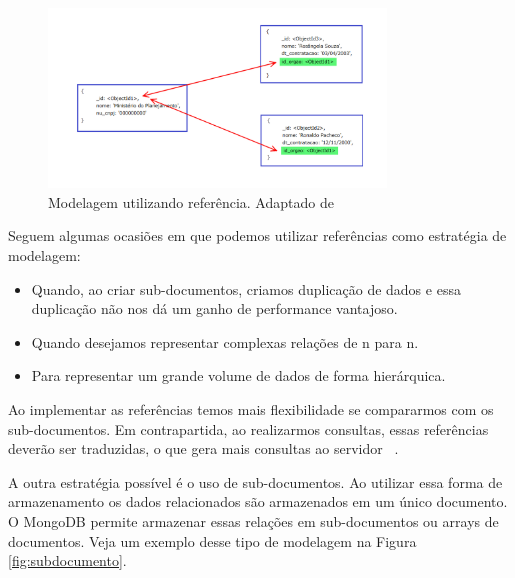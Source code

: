 	\begin{figure}[!htbp]
		\begin{center}
			\includegraphics[width=0.8\textwidth]{referencia}
		\end{center}
		\caption{ Modelagem utilizando referência. Adaptado de ~\cite{sitemongodb}}
		\label{fig:referencia}
	\end{figure}

Seguem algumas ocasiões em que podemos utilizar referências como estratégia de modelagem:

\begin{itemize}
	\item Quando, ao criar sub-documentos, criamos duplicação de dados e essa duplicação não nos dá um ganho de performance vantajoso.
	\item Quando desejamos representar complexas relações de n para n.
	\item Para representar um grande volume de dados de forma hierárquica.
\end{itemize}

Ao implementar as referências temos mais flexibilidade se compararmos com os sub-documentos. Em contrapartida, ao realizarmos consultas, essas referências deverão ser traduzidas, o que gera mais consultas ao servidor ~\cite{Orendanalysisand}.


A outra estratégia possível é o uso de sub-documentos. Ao utilizar essa forma de armazenamento os dados relacionados são armazenados em um único documento. O MongoDB permite armazenar essas relações em sub-documentos ou arrays de documentos. Veja um exemplo desse tipo de modelagem na Figura \ref{fig:subdocumento}.

